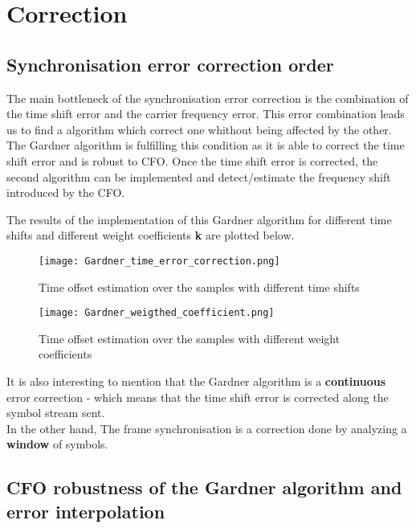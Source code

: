 \section{Correction}

\subsection{Synchronisation error correction order}

The main bottleneck of the synchronisation error correction is the combination of the time shift error and
 the carrier frequency error.
This error combination leads us to find a algorithm which correct one whithout being affected by the other.
The Gardner algorithm is fulfilling this condition as it is able to correct the time shift error and is robust to CFO.
Once the time shift error is corrected, the second algorithm can be implemented and detect/estimate the frequency shift introduced by the CFO.\newline

The results of the implementation of this Gardner algorithm for different time shifts and different weight coefficients \textbf{k} are plotted below.

\begin{figure}[H]
    \centering
    \texttt{[image: Gardner\_time\_error\_correction.png]}
    \caption{Time offset estimation over the samples with different time shifts}
    \label{fig:Gardner_time_error_correction}
\end{figure}

\begin{figure}[H]
    \centering
    \texttt{[image: Gardner\_weigthed\_coefficient.png]}
    \caption{Time offset estimation over the samples with different weight coefficients}
    \label{fig:Gardner_weigthed_coefficient}
\end{figure}

It is also interesting to mention that the Gardner algorithm is a \textbf{continuous} error correction - which means that
the time shift error is corrected along the symbol stream sent.\\
In the other hand, The frame synchronisation is a correction done by analyzing a \textbf{window} of symbols.

\subsection{CFO robustness of the Gardner algorithm and error interpolation}

